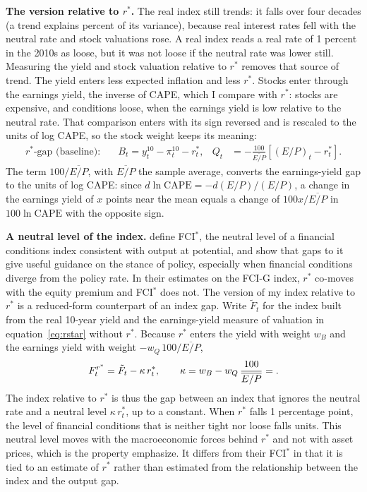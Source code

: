\documentclass[11pt]{article}
\newcommand{\rs}{r^{*}}
\begin{document}
\textbf{The version relative to $r^*$.} The real index still trends: it falls over four decades (a trend explains  percent of its variance), because real interest rates fell with the neutral rate and stock valuations rose. A real index reads a real rate of 1 percent in the 2010s as loose, but it was not loose if the neutral rate was lower still. Measuring the yield and stock valuation relative to $\rs$ removes that source of trend. The yield enters less expected inflation and less $\rs$. Stocks enter through the earnings yield, the inverse of CAPE, which I compare with $\rs$: stocks are expensive, and conditions loose, when the earnings yield is low relative to the neutral rate. That comparison enters with its sign reversed and is rescaled to the units of log CAPE, so the stock weight keeps its meaning:
\begin{align}
\text{$\rs$-gap (baseline):}\quad & B_t = y^{10}_t - \pi^{10}_t - \rs_t, & Q_t &= -\frac{100}{\overline{E/P}}\left[(E/P)_t - \rs_t\right]. \label{eq:rstar}
\end{align}
The term $100/\overline{E/P}$, with $\overline{E/P}$ the sample average, converts the earnings-yield gap to the units of log CAPE: since $d\ln\text{CAPE}=-d(E/P)/(E/P)$, a change in the earnings yield of $x$ points near the mean equals a change of $100x/\overline{E/P}$ in $100\ln\text{CAPE}$ with the opposite sign.

\textbf{A neutral level of the index.} \citet{caballero2026} define FCI$^*$, the neutral level of a financial conditions index consistent with output at potential, and show that gaps to it give useful guidance on the stance of policy, especially when financial conditions diverge from the policy rate. In their estimates on the FCI-G index, $\rs$ co-moves with the equity premium and FCI$^*$ does not. The version of my index relative to $\rs$ is a reduced-form counterpart of an index gap. Write $\tilde F_t$ for the index built from the real 10-year yield and the earnings-yield measure of valuation in equation~\eqref{eq:rstar} without $\rs$. Because $\rs$ enters the yield with weight $w_B$ and the earnings yield with weight $-w_Q\,100/\overline{E/P}$,
\begin{equation}
F^{\rs}_t = \tilde F_t - \kappa\, \rs_t, \qquad \kappa = w_B - w_Q\,\frac{100}{\overline{E/P}} = \bl{rv:kap}. \label{eq:fcistar}
\end{equation}
The index relative to $\rs$ is thus the gap between an index that ignores the neutral rate and a neutral level $\kappa\,\rs_t$, up to a constant. When $\rs$ falls 1 percentage point, the level of financial conditions that is neither tight nor loose falls  units. This neutral level moves with the macroeconomic forces behind $\rs$ and not with asset prices, which is the property \citet{caballero2026} emphasize. It differs from their FCI$^*$ in that it is tied to an estimate of $\rs$ rather than estimated from the relationship between the index and the output gap.
\end{document}
